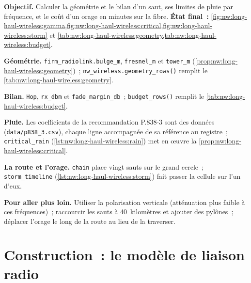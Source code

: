 \begin{tutorial}
\textbf{Objectif.} Calculer la géométrie et le bilan d'un saut, ses limites de pluie par fréquence, et le coût d'un orage en minutes sur la fibre.
\textbf{État final~:} \cref{fig:nw:long-haul-wireless:gamma,fig:nw:long-haul-wireless:critical,fig:nw:long-haul-wireless:storm} et
\cref{tab:nw:long-haul-wireless:geometry,tab:nw:long-haul-wireless:budget}.
\begin{tutsteps}
\item \textbf{Géométrie.} \texttt{firm\_radiolink.bulge\_m}, \texttt{fresnel\_m} et \texttt{tower\_m} (\cref{prop:nw:long-haul-wireless:geometry})~;
  \texttt{nw\_wireless.geometry\_rows()} remplit le \cref{tab:nw:long-haul-wireless:geometry}.
\item \textbf{Bilan.} \texttt{Hop}, \texttt{rx\_dbm} et \texttt{fade\_margin\_db}~; \texttt{budget\_rows()} remplit
  le \cref{tab:nw:long-haul-wireless:budget}.
\item \textbf{Pluie.} Les coefficients de la recommandation P.838-3 sont des données (\texttt{data/p838\_3.csv}), chaque ligne accompagnée de sa référence au registre~;
  \texttt{critical\_rain} (\cref{lst:nw:long-haul-wireless:rain}) met en œuvre la \cref{prop:nw:long-haul-wireless:critical}.
\item \textbf{La route et l'orage.} \texttt{chain} place vingt sauts sur le grand cercle~; \texttt{storm\_timeline}
  (\cref{lst:nw:long-haul-wireless:storm}) fait passer la cellule sur l'un d'eux.
\end{tutsteps}
\textbf{Pour aller plus loin.} Utiliser la polarisation verticale (atténuation plus faible à ces fréquences)~; raccourcir les sauts à 40~kilomètres et ajouter
  des pylônes~; déplacer l'orage le long de la route au lieu de la traverser.
\end{tutorial}

\section{Construction~: le modèle de liaison radio}\label{bld:nw:long-haul-wireless:radiolink}

